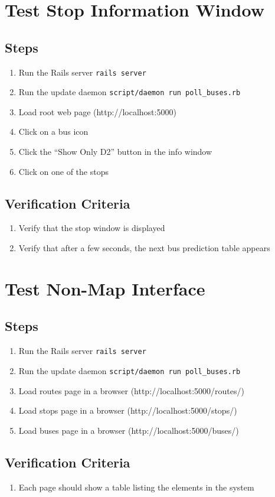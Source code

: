 \documentclass[12pt]{report}
\newcommand{\lstBash}{\lstinline[language=bash,breaklines=true]}
\begin{document}
\section{Test Stop Information Window}
\subsection*{Steps}
\begin{enumerate}
\item Run the Rails server \lstBash|rails server|
\item Run the update daemon \lstBash|script/daemon run poll_buses.rb|
\item Load root web page (http://localhost:5000)
\item Click on a bus icon
\item Click the ``Show Only D2'' button in the info window
\item Click on one of the stops
\end{enumerate}
\subsection*{Verification Criteria}
\begin{enumerate}
\item Verify that the stop window is displayed
\item Verify that after a few seconds, the next bus prediction table appears
\end{enumerate}


\section{Test Non-Map Interface}
\subsection*{Steps}
\begin{enumerate}
\item Run the Rails server \lstBash|rails server|
\item Run the update daemon \lstBash|script/daemon run poll_buses.rb|
\item Load routes page in a browser (http://localhost:5000/routes/)
\item Load stops page in a browser (http://localhost:5000/stops/)
\item Load buses page in a browser (http://localhost:5000/buses/)
\end{enumerate}
\subsection*{Verification Criteria}
\begin{enumerate}
\item Each page should show a table listing the elements in the system
\end{enumerate}
\end{document}
